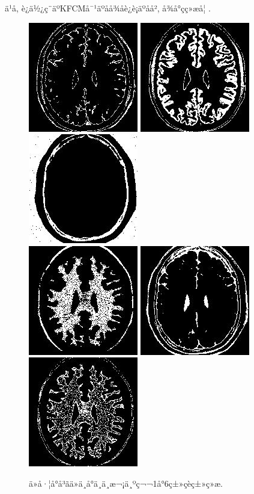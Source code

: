 \documentclass[lang=cn,11pt]{elegantpaper}
\begin{document}
ä¹å, è¿ä½¿ç¨äºKFCMå¯¹äºåå¾åè¿è¡äºåå², å¾å°çç»æå¦ .

\begin{figure}[ht]
    \centering
    \includegraphics[width=.25\textwidth]{Brain/KFCM150/2020-03-19_21-10-05Kind3.jpg}
    \includegraphics[width=.25\textwidth]{Brain/KFCM150/2020-03-19_21-10-05Kind1.jpg}
    \includegraphics[width=.25\textwidth]{Brain/KFCM150/2020-03-19_21-10-05Kind5.jpg}\\

    \vspace{2pt}
    \includegraphics[width=.25\textwidth]{Brain/KFCM150/2020-03-19_21-10-05Kind4.jpg}
    \includegraphics[width=.25\textwidth]{Brain/KFCM150/2020-03-19_21-10-05Kind6.jpg}
    \includegraphics[width=.25\textwidth]{Brain/KFCM150/2020-03-19_21-10-05Kind2.jpg}
    \caption{ä»å·¦å°å³ãä»ä¸å°ä¸ä¸æ¬¡ä¸ºç¬¬1å°6ç±»çèç±»ç»æ. \label{fig:KFCM}}
\end{figure}
\end{document}

